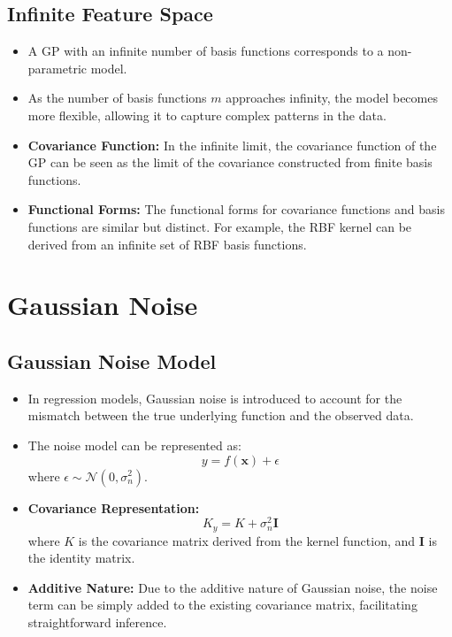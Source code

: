 \documentclass[12pt]{article}
\begin{document}
\subsection{Infinite Feature Space}
\begin{itemize}
    \item A GP with an infinite number of basis functions corresponds to a non-parametric model.
    \item As the number of basis functions \( m \) approaches infinity, the model becomes more flexible, allowing it to capture complex patterns in the data.
    \item \textbf{Covariance Function:} In the infinite limit, the covariance function of the GP can be seen as the limit of the covariance constructed from finite basis functions.
    \item \textbf{Functional Forms:} The functional forms for covariance functions and basis functions are similar but distinct. For example, the RBF kernel can be derived from an infinite set of RBF basis functions.
\end{itemize}

\section{Gaussian Noise}

\subsection{Gaussian Noise Model}
\begin{itemize}
    \item In regression models, Gaussian noise is introduced to account for the mismatch between the true underlying function and the observed data.
    \item The noise model can be represented as:
    \[
    y = f(\mathbf{x}) + \epsilon
    \]
    where \( \epsilon \sim \mathcal{N}(0, \sigma_n^2) \).
    \item \textbf{Covariance Representation:}
    \[
    K_y = K + \sigma_n^2 \mathbf{I}
    \]
    where \( K \) is the covariance matrix derived from the kernel function, and \( \mathbf{I} \) is the identity matrix.
    \item \textbf{Additive Nature:} Due to the additive nature of Gaussian noise, the noise term can be simply added to the existing covariance matrix, facilitating straightforward inference.
\end{itemize}
\end{document}
